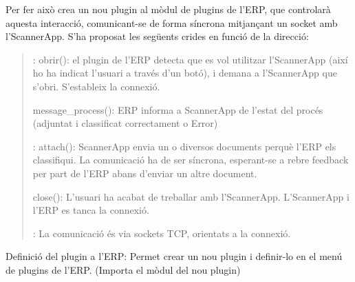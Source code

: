 \documentclass[letterpaper,11pt,catalan]{sphinxmanual}
\begin{document}
Per fer això crea un nou plugin al mòdul de plugins de l'ERP, que controlarà aquesta interacció,
comunicant-se de forma síncrona mitjançant un socket amb l'ScannerApp.
S'ha proposat les següents crides en funció de la direcció:
\begin{quote}

:
obrir(): el plugin de l'ERP detecta que es vol utilitzar l'ScannerApp (així ho ha indicat l'usuari
a través d'un botó), i demana a l'ScannerApp que s'obri. S'estableix la connexió.

message\_process(): ERP informa a ScannerApp de l'estat del procés (adjuntat i classificat correctament o Error)

:
attach(): ScannerApp envia un o diversos documents perquè l'ERP els classifiqui. La comunicació
ha de ser síncrona, esperant-se a rebre feedback per part de l'ERP abans d'enviar un altre
document.

close(): L'usuari ha acabat de treballar amb l'ScannerApp. L'ScannerApp i l'ERP es tanca la connexió.

: La comunicació és via sockets TCP, orientats a la connexió.
\end{quote}

Definició del plugin a l'ERP:
Permet crear un nou plugin i definir-lo en el menú de plugins de l'ERP.
(Importa el mòdul del nou plugin)
\end{document}
